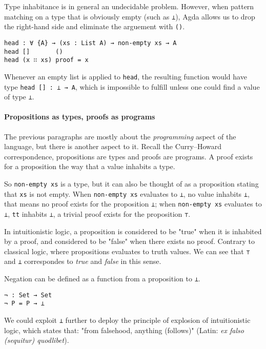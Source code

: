\documentclass[../thesis.tex]{subfiles}
\begin{document}
Type inhabitance is in general an undecidable problem.
However, when pattern matching on a type that is obviously empty (such as {\lstinline|⊥|}),
Agda allows us to drop the right-hand side and eliminate the arguement with {\lstinline|()|}.

\begin{lstlisting}
head : ∀ {A} → (xs : List A) → non-empty xs → A
head []       ()
head (x ∷ xs) proof = x
\end{lstlisting}

Whenever an empty list is applied to {\lstinline|head|},
the resulting function would have type {\lstinline|head [] : ⊥ → A|},
which is impossible to fulfill unless one could find a value of type {\lstinline|⊥|}.

\paragraph{Propositions as types, proofs as programs}

The previous paragraphs are mostly about the \textit{programming}
aspect of the language, but there is another aspect to it.
Recall the Curry–Howard correspondence, propositions are types and proofs are
programs. A proof exists for a proposition the way that a value inhabits a type.

So {\lstinline|non-empty xs|} is a type, but it can also be thought of as a
proposition stating that {\lstinline|xs|} is not empty.
When {\lstinline|non-empty xs|} evaluates to {\lstinline|⊥|}, no value inhabits
{\lstinline|⊥|}, that means no proof exists for the proposition {\lstinline|⊥|};
when {\lstinline|non-empty xs|} evaluates to {\lstinline|⊥|}, {\lstinline|tt|}
inhabits {\lstinline|⊥|}, a trivial proof exists for the proposition {\lstinline|⊤|}.

In intuitionistic logic, a proposition is considered to be "true" when it is
inhabited by a proof, and considered to be "false" when there exists no proof.
Contrary to classical logic, where propositions evaluates to truth values.
We can see that {\lstinline|⊤|} and {\lstinline|⊥|} correspondes to \textit{true}
and \textit{false} in this sense.

Negation can be defined as a function from a proposition to {\lstinline|⊥|}.

\begin{lstlisting}
¬ : Set → Set
¬ P = P → ⊥
\end{lstlisting}

We could exploit {\lstinline|⊥|} further to deploy the principle of explosion
of intuitionistic logic, which states that: "from falsehood, anything (follows)"
(Latin: \textit{ex falso (sequitur) quodlibet}).
\end{document}

